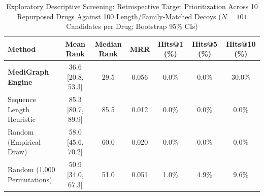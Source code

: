 \begin{table}[t]
\centering
\caption{Exploratory Descriptive Screening: Retrospective Target Prioritization Across 10 Repurposed Drugs Against 100 Length/Family-Matched Decoys ($N=101$ Candidates per Drug; Bootstrap 95\% CIs)}
\label{tab:repurposing_recovery}
\small
\begin{tabular}{lcccccc}
\hline
\textbf{Method} & \textbf{Mean Rank} & \textbf{Median Rank} & \textbf{MRR} & \textbf{Hits@1 (\%)} & \textbf{Hits@5 (\%)} & \textbf{Hits@10 (\%)} \\
\hline
\textbf{MediGraph Engine} & 36.6 [20.8, 53.3] & 29.5 & 0.056 & 0.0\% & 0.0\% & 30.0\% \\
Sequence Length Heuristic & 85.3 [80.7, 89.9] & 85.5 & 0.012 & 0.0\% & 0.0\% & 0.0\% \\
Random (Empirical Draw) & 58.0 [45.6, 70.2] & 60.0 & 0.020 & 0.0\% & 0.0\% & 0.0\% \\
Random (1,000 Permutations) & 50.9 [34.0, 67.3] & 51.0 & 0.051 & 1.0\% & 4.9\% & 9.6\% \\
\hline
\end{tabular}
\end{table}
